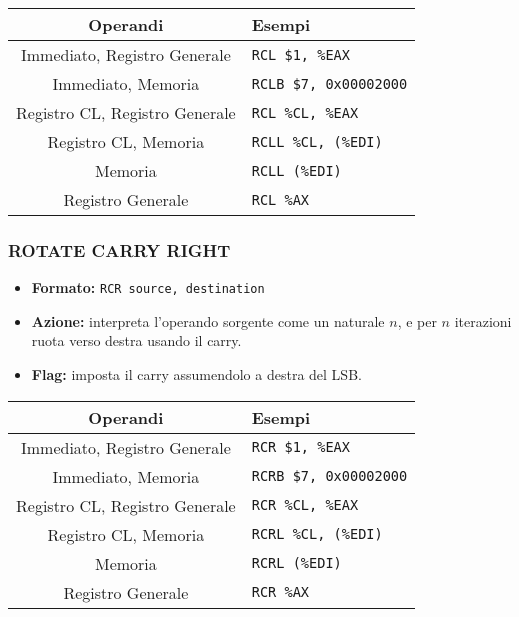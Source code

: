 \documentclass[a4paper,11pt]{article}
\begin{document}
		\begin{table}[H]
		\center {}
			\begin{tabular} { c | p{5cm} }
				\bfseries Operandi & \bfseries Esempi \\
				\hline
				Immediato, Registro Generale & \texttt{RCL \$1, \%EAX} \\
				Immediato, Memoria & \texttt{RCLB \$7, 0x00002000} \\
				Registro CL, Registro Generale & \texttt{RCL \%CL, \%EAX} \\
				Registro CL, Memoria & \texttt{RCLL \%CL, (\%EDI)} \\
				Memoria & \texttt{RCLL (\%EDI)} \\ 
				Registro Generale & \texttt{RCL \%AX}
			\end{tabular}
		\end{table}

\subsubsection{ROTATE CARRY RIGHT}
\begin{itemize}
	\item \textbf{Formato:} \texttt{RCR source, destination}
	\item \textbf{Azione:} interpreta l'operando sorgente come un naturale $n$, e per $n$ iterazioni ruota verso destra usando il carry.
	\item \textbf{Flag:} imposta il carry assumendolo a destra del LSB.
\end{itemize}

		\begin{table}[H]
		\center {}
			\begin{tabular} { c | p{5cm} }
				\bfseries Operandi & \bfseries Esempi \\
				\hline
				Immediato, Registro Generale & \texttt{RCR \$1, \%EAX} \\
				Immediato, Memoria & \texttt{RCRB \$7, 0x00002000} \\
				Registro CL, Registro Generale & \texttt{RCR \%CL, \%EAX} \\
				Registro CL, Memoria & \texttt{RCRL \%CL, (\%EDI)} \\
				Memoria & \texttt{RCRL (\%EDI)} \\ 
				Registro Generale & \texttt{RCR \%AX}
			\end{tabular}
		\end{table}
\end{document}
